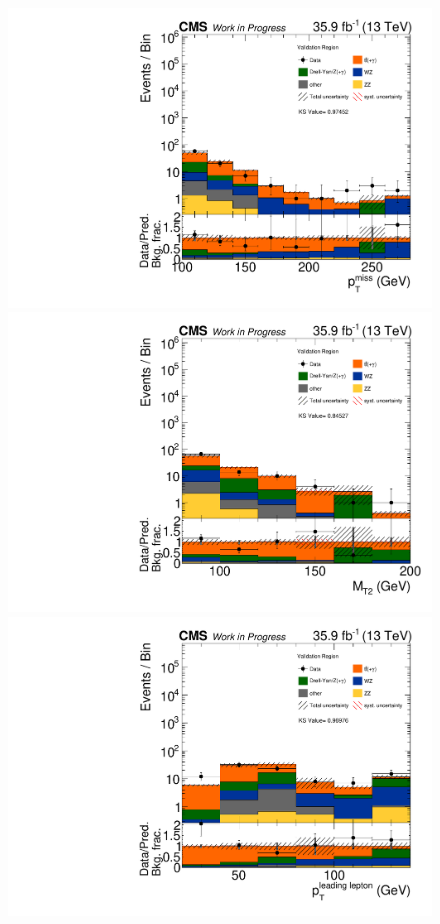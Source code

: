 \begin{figure}[htb]
 \centering
 \includegraphics[width=\pairwidth]{figures/plots_VR/VR_LL_met_log}
 \includegraphics[width=\pairwidth]{figures/plots_VR/VR_LL_mt2_log}\\
 \includegraphics[width=\pairwidth]{figures/plots_VR/VR_LL_pt1_log}

\end{figure}
